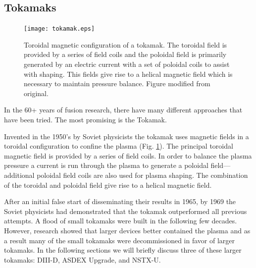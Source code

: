 \subsection{Tokamaks}
\begin{figure}[ht]
    \centering
    \texttt{[image: tokamak.eps]}
    \caption{Toroidal magnetic configuration of a tokamak. The toroidal field is provided by a series of field coils and the poloidal field is primarily generated by an electric current with a set of poloidal coils to assist with shaping. This fields give rise to a helical magnetic field which is necessary to maintain pressure balance. Figure modified from original\cite{geiger2013thesis}.}
    \label{fig:tokamak}
\end{figure}
In the 60+ years of fusion research, there have many different approaches that have been tried. The most promising is the Tokamak.

Invented in the 1950's by Soviet physicists the tokamak uses magnetic fields in a toroidal configuration to confine the plasma (Fig. \ref{fig:tokamak}). The principal toroidal magnetic field is provided by a series of field coils. In order to balance the plasma pressure a current is run through the plasma to generate a poloidal field---additional poloidal field coils are also used for plasma shaping. The combination of the toroidal and poloidal field give rise to a helical magnetic field.

After an initial false start of disseminating their results in 1965, by 1969 the Soviet physicists had demonstrated that the tokamak outperformed all previous attempts. A flood of small tokamaks were built in the following few decades. However, research showed that larger devices better contained the plasma and as a result many of the small tokamaks were decommissioned in favor of larger tokamaks. In the following sections we will briefly discuss three of these larger tokamaks: DIII-D, ASDEX Upgrade, and NSTX-U.


